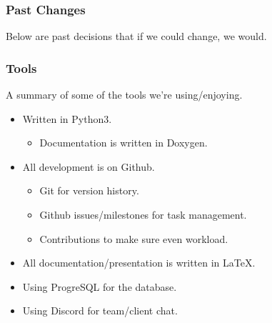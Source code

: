 \documentclass{beamer}
\newcounter{tools}
\begin{document}
\begin{frame}
    \frametitle{Past Changes}
    Below are past decisions that if we could change, we would. \pause

    \centering
\end{frame}


\begin{frame}
    \frametitle{Tools }
    A summary of some of the tools we're using/enjoying.

    \begin{itemize}
        \item Written in Python3.
        \begin{itemize}
            \item Documentation is written in Doxygen.
        \end{itemize}

        \item All development is on Github.
        \begin{itemize}
            \item Git for version history.
            \item Github issues/milestones for task management.
            \item Contributions to make sure even workload.
        \end{itemize}

        \item All documentation/presentation is written in \LaTeX{}.
        \item Using ProgreSQL for the database.
        \item Using Discord for team/client chat.
    \end{itemize}
\end{frame}
\end{document}
